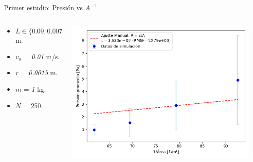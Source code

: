 \documentclass{beamer}
\begin{document}
\begin{frame}{Primer estudio: Presión vs $A^{-1}$}
  \begin{columns}
    \begin{column}{0.40\textwidth}
      \scriptsize {}
      \begin{itemize}
        \item $L \in \{ \textit{0.09}, \textit{0.007}, \textit{0.05}, \textit{0.03} \}$ m.
        \item $v_o$ = \textit{0.01} m/s.
        \item $r$ = \textit{0.0015} m.
        \item $m$ = \textit{1} kg.
        \item $N$ = 250.
      \end{itemize}
    \end{column}
    \begin{column}{0.60\textwidth}
      \includegraphics[width=1\linewidth]{photoMaterial/Presion_vs_area_ajuste.png}
    \end{column}
  \end{columns}
\end{frame}
\end{document}
